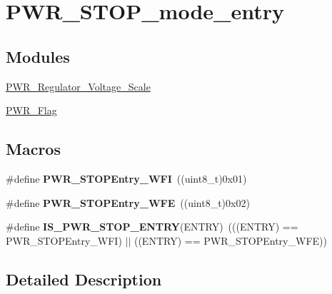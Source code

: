 \hypertarget{group___p_w_r___s_t_o_p__mode__entry}{\section{P\-W\-R\-\_\-\-S\-T\-O\-P\-\_\-mode\-\_\-entry}
\label{group___p_w_r___s_t_o_p__mode__entry}
}
\subsection*{Modules}
\begin{DoxyCompactItemize}
\item 
\hyperlink{group___p_w_r___regulator___voltage___scale}{P\-W\-R\-\_\-\-Regulator\-\_\-\-Voltage\-\_\-\-Scale}
\item 
\hyperlink{group___p_w_r___flag}{P\-W\-R\-\_\-\-Flag}
\end{DoxyCompactItemize}
\subsection*{Macros}
\begin{DoxyCompactItemize}
\item 
\hypertarget{group___p_w_r___s_t_o_p__mode__entry_gaa1e1362f3d0b93e8f5f674e18cfc96c4}{\#define {\bfseries P\-W\-R\-\_\-\-S\-T\-O\-P\-Entry\-\_\-\-W\-F\-I}~((uint8\-\_\-t)0x01)}\label{group___p_w_r___s_t_o_p__mode__entry_gaa1e1362f3d0b93e8f5f674e18cfc96c4}

\item 
\hypertarget{group___p_w_r___s_t_o_p__mode__entry_gaac98ac55fb8764121d4168d99c9b369e}{\#define {\bfseries P\-W\-R\-\_\-\-S\-T\-O\-P\-Entry\-\_\-\-W\-F\-E}~((uint8\-\_\-t)0x02)}\label{group___p_w_r___s_t_o_p__mode__entry_gaac98ac55fb8764121d4168d99c9b369e}

\item 
\hypertarget{group___p_w_r___s_t_o_p__mode__entry_ga4a94eb1f400dec6e486fbc229cbea8a0}{\#define {\bfseries I\-S\-\_\-\-P\-W\-R\-\_\-\-S\-T\-O\-P\-\_\-\-E\-N\-T\-R\-Y}(E\-N\-T\-R\-Y)~(((E\-N\-T\-R\-Y) == P\-W\-R\-\_\-\-S\-T\-O\-P\-Entry\-\_\-\-W\-F\-I) $|$$|$ ((E\-N\-T\-R\-Y) == P\-W\-R\-\_\-\-S\-T\-O\-P\-Entry\-\_\-\-W\-F\-E))}\label{group___p_w_r___s_t_o_p__mode__entry_ga4a94eb1f400dec6e486fbc229cbea8a0}

\end{DoxyCompactItemize}


\subsection{Detailed Description}
